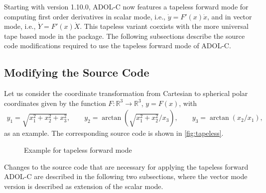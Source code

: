 \documentclass[11pt,twoside]{article}
\begin{document}
Starting with version 1.10.0, ADOL-C now features a tapeless forward
mode for computing first order derivatives in scalar mode, i.e.,
$\dot{y} = F'(x)\dot{x}$, and in vector mode, i.e., $\dot{Y} = F'(x)\dot{X}$. 
This tapeless variant coexists with the more universal
tape based mode in the package. The following subsections describe
the source code modifications required to use the tapeless forward mode of
ADOL-C.  
%
\subsection{Modifying the Source Code}
%
Let us consider the coordinate transformation from Cartesian to spherical
polar coordinates given by the function $F: \mathbb{R}^3 \to \mathbb{R}^3$, $y
= F(x)$, with
\begin{eqnarray*}
y_1  =  \sqrt{x_1^2 + x_2^2 + x_3^2},\qquad
y_2  =  \arctan\left(\sqrt{x_1^2 + x_2^2}/x_3\right),\qquad
y_3  =  \arctan(x_2/x_1),
\end{eqnarray*}
as an example. The corresponding source code is shown in \autoref{fig:tapeless}.
\begin{figure}[htb]
\caption{Example for tapeless forward mode}
\label{fig:tapeless}
\end{figure}
%
Changes to the source code that are necessary for applying the
tapeless forward ADOL-C are described in the following two
subsections, where the vector mode version is described
as extension of the scalar mode. 
%
\end{document}
